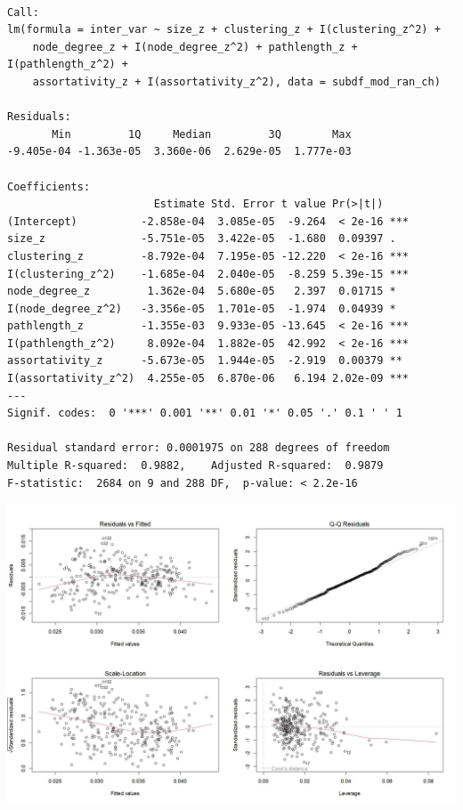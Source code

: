 \documentclass[
]{article}
\begin{document}
\begin{verbatim}

Call:
lm(formula = inter_var ~ size_z + clustering_z + I(clustering_z^2) + 
    node_degree_z + I(node_degree_z^2) + pathlength_z + I(pathlength_z^2) + 
    assortativity_z + I(assortativity_z^2), data = subdf_mod_ran_ch)

Residuals:
       Min         1Q     Median         3Q        Max 
-9.405e-04 -1.363e-05  3.360e-06  2.629e-05  1.777e-03 

Coefficients:
                       Estimate Std. Error t value Pr(>|t|)    
(Intercept)          -2.858e-04  3.085e-05  -9.264  < 2e-16 ***
size_z               -5.751e-05  3.422e-05  -1.680  0.09397 .  
clustering_z         -8.792e-04  7.195e-05 -12.220  < 2e-16 ***
I(clustering_z^2)    -1.685e-04  2.040e-05  -8.259 5.39e-15 ***
node_degree_z         1.362e-04  5.680e-05   2.397  0.01715 *  
I(node_degree_z^2)   -3.356e-05  1.701e-05  -1.974  0.04939 *  
pathlength_z         -1.355e-03  9.933e-05 -13.645  < 2e-16 ***
I(pathlength_z^2)     8.092e-04  1.882e-05  42.992  < 2e-16 ***
assortativity_z      -5.673e-05  1.944e-05  -2.919  0.00379 ** 
I(assortativity_z^2)  4.255e-05  6.870e-06   6.194 2.02e-09 ***
---
Signif. codes:  0 '***' 0.001 '**' 0.01 '*' 0.05 '.' 0.1 ' ' 1

Residual standard error: 0.0001975 on 288 degrees of freedom
Multiple R-squared:  0.9882,    Adjusted R-squared:  0.9879 
F-statistic:  2684 on 9 and 288 DF,  p-value: < 2.2e-16
\end{verbatim}

\begin{center}\includegraphics{./Figures/unnamed-chunk-127-1} \end{center}
\end{document}
